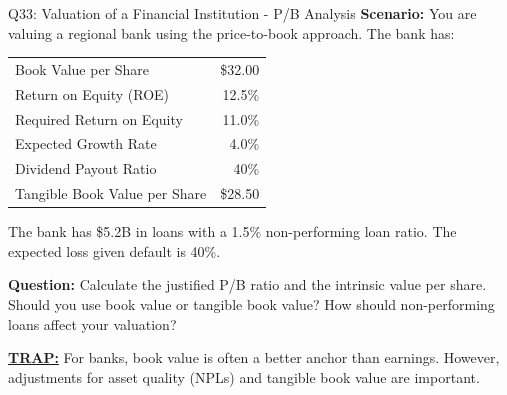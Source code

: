 \documentclass{beamer}
\renewcommand{\scriptsize}{\fontsize{6pt}{7pt}\selectfont}
\begin{document}
	\begin{frame}{Q33: Valuation of a Financial Institution - P/B Analysis}
		\scriptsize
		\textbf{Scenario:} You are valuing a regional bank using the price-to-book approach. The bank has:
		
		\begin{tabular}{lr}
			Book Value per Share & \$32.00 \\
			Return on Equity (ROE) & 12.5\% \\
			Required Return on Equity & 11.0\% \\
			Expected Growth Rate & 4.0\% \\
			Dividend Payout Ratio & 40\% \\
			Tangible Book Value per Share & \$28.50 \\
		\end{tabular}
		
		The bank has \$5.2B in loans with a 1.5\% non-performing loan ratio. The expected loss given default is 40\%.
		
		\textbf{Question:} Calculate the justified P/B ratio and the intrinsic value per share. Should you use book value or tangible book value? How should non-performing loans affect your valuation?
		
		\vspace{2pt}
		\underline{\textbf{TRAP:}} For banks, book value is often a better anchor than earnings. However, adjustments for asset quality (NPLs) and tangible book value are important.
	\end{frame}
	
\end{document}
